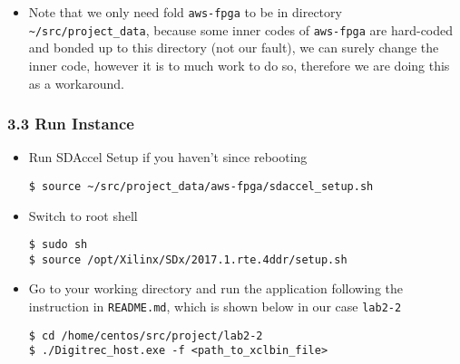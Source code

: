 \documentclass[]{article}
\begin{document}
\begin{itemize}
\item
  Note that we only need fold \texttt{aws-fpga} to be in directory
  \texttt{\textasciitilde{}/src/project\_data}, because some inner codes
  of \texttt{aws-fpga} are hard-coded and bonded up to this directory
  (not our fault), we can surely change the inner code, however it is to
  much work to do so, therefore we are doing this as a workaround.
\end{itemize}

\hypertarget{header-n486}{%
\subsubsection{3.3 Run Instance}\label{header-n486}}

\begin{itemize}
\item
  Run SDAccel Setup if you haven't since rebooting

\begin{verbatim}
$ source ~/src/project_data/aws-fpga/sdaccel_setup.sh
\end{verbatim}
\item
  Switch to root shell

\begin{verbatim}
$ sudo sh
$ source /opt/Xilinx/SDx/2017.1.rte.4ddr/setup.sh
\end{verbatim}
\item
  Go to your working directory and run the application following the
  instruction in \texttt{README.md}, which is shown below in our case
  \texttt{lab2-2}

\begin{verbatim}
$ cd /home/centos/src/project/lab2-2
$ ./Digitrec_host.exe -f <path_to_xclbin_file>
\end{verbatim}
\end{itemize}
\end{document}
